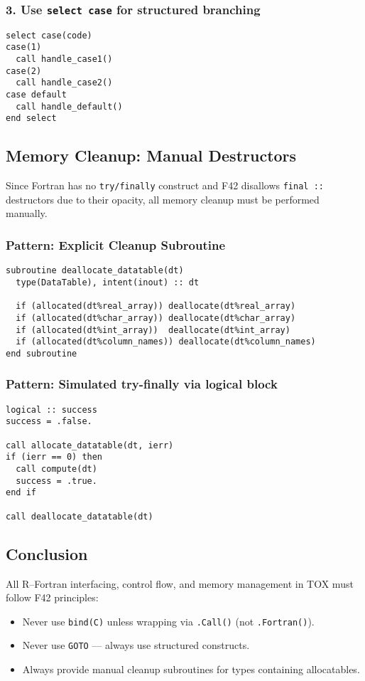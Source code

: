\documentclass{article}
\begin{document}
\subsubsection*{3. Use \texttt{select case} for structured branching}
\begin{verbatim}
select case(code)
case(1)
  call handle_case1()
case(2)
  call handle_case2()
case default
  call handle_default()
end select
\end{verbatim}

\subsection{Memory Cleanup: Manual Destructors}

Since Fortran has no \texttt{try/finally} construct and F42 disallows \texttt{final ::} destructors due to their opacity, all memory cleanup must be performed manually.

\subsubsection*{Pattern: Explicit Cleanup Subroutine}
\begin{verbatim}
subroutine deallocate_datatable(dt)
  type(DataTable), intent(inout) :: dt

  if (allocated(dt%real_array)) deallocate(dt%real_array)
  if (allocated(dt%char_array)) deallocate(dt%char_array)
  if (allocated(dt%int_array))  deallocate(dt%int_array)
  if (allocated(dt%column_names)) deallocate(dt%column_names)
end subroutine
\end{verbatim}

\subsubsection*{Pattern: Simulated try-finally via logical block}
\begin{verbatim}
logical :: success
success = .false.

call allocate_datatable(dt, ierr)
if (ierr == 0) then
  call compute(dt)
  success = .true.
end if

call deallocate_datatable(dt)
\end{verbatim}

\subsection*{Conclusion}

All R–Fortran interfacing, control flow, and memory management in TOX must follow F42 principles:
\begin{itemize}
  \item Never use \texttt{bind(C)} unless wrapping via \texttt{.Call()} (not \texttt{.Fortran()}).
  \item Never use \texttt{GOTO} — always use structured constructs.
  \item Always provide manual cleanup subroutines for types containing allocatables.
\end{itemize}
\end{document}
